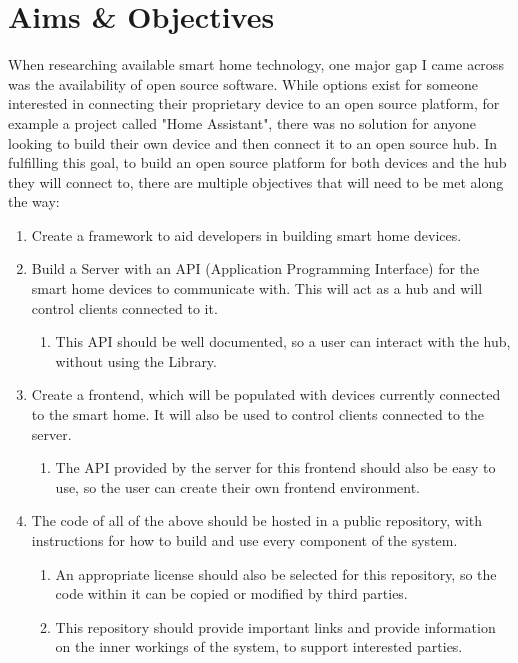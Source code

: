 \section{Aims \& Objectives} \label{sec:intro:aims}
When researching available smart home technology, one major gap I came across 
was the availability of open source software. While options exist for someone 
interested in connecting their proprietary device to an open source platform, for example a project called "Home Assistant", there was no solution for anyone looking to build their own device and then connect it to an open source hub. In fulfilling this goal, to build an open source platform for both devices and the hub they will connect to, there are multiple objectives that will need to be met along the way:
\begin{enumerate}
    \item Create a framework to aid developers in building smart home devices.
    \item Build a Server with an API (Application Programming Interface) for the smart home devices to communicate 
        with. This will act as a hub and will control clients connected to it.
         \begin{enumerate}
             \item This API should be well documented, so a user can interact 
                 with the hub, without using the Library.
         \end{enumerate}
     \item Create a frontend, which will be populated with devices currently 
         connected to the smart home. It will also be used to control clients 
         connected to the server.
         \begin{enumerate}
             \item The API provided by the server for this frontend should also 
                 be easy to use, so the user can create their own frontend 
                 environment.
         \end{enumerate}
     \item The code of all of the above should be hosted in a public repository, 
         with instructions for how to build and use every component of the 
         system.
         \begin{enumerate}
             \item An appropriate license should also be selected for this 
                 repository, so the code within it can be copied or modified by 
                 third parties.
             \item This repository should provide important links and provide 
                 information on the inner workings of the system, to support 
                 interested parties.
         \end{enumerate}
\end{enumerate}
    
